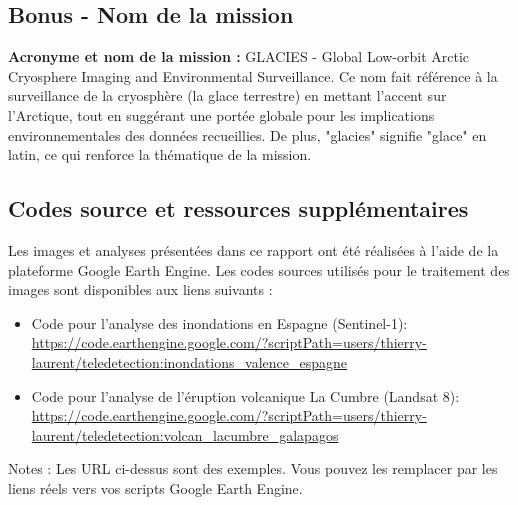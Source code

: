 \documentclass[12pt,a4paper]{article}
\begin{document}
\subsection{Bonus - Nom de la mission}
\textbf{Acronyme et nom de la mission :}
GLACIES - Global Low-orbit Arctic Cryosphere Imaging and Environmental Surveillance. Ce nom fait référence à la surveillance de la cryosphère (la glace terrestre) en mettant l'accent sur l'Arctique, tout en suggérant une portée globale pour les implications environnementales des données recueillies. De plus, "glacies" signifie "glace" en latin, ce qui renforce la thématique de la mission.

\newpage



\newpage
\subsection*{Codes source et ressources supplémentaires}

Les images et analyses présentées dans ce rapport ont été réalisées à l'aide de la plateforme Google Earth Engine. Les codes sources utilisés pour le traitement des images sont disponibles aux liens suivants :

\begin{itemize}
    \item Code pour l'analyse des inondations en Espagne (Sentinel-1): 
    \url{https://code.earthengine.google.com/?scriptPath=users/thierry-laurent/teledetection:inondations_valence_espagne}
    
    \item Code pour l'analyse de l'éruption volcanique La Cumbre (Landsat 8): 
    \url{https://code.earthengine.google.com/?scriptPath=users/thierry-laurent/teledetection:volcan_lacumbre_galapagos}
\end{itemize}

Notes : Les URL ci-dessus sont des exemples. Vous pouvez les remplacer par les liens réels vers vos scripts Google Earth Engine.
\end{document}
